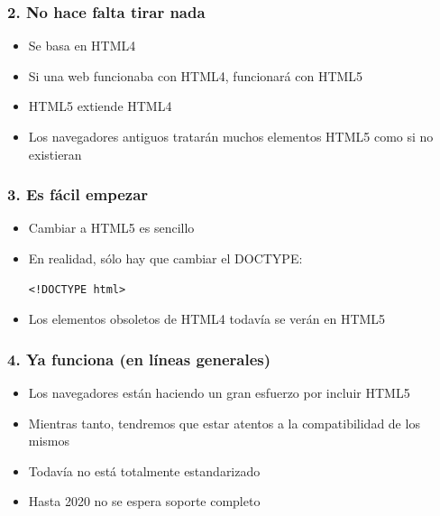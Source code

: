 \begin{frame}
\frametitle{2. No hace falta tirar nada}

\begin{itemize}
  \item Se basa en HTML4
  \item Si una web funcionaba con HTML4, funcionará con HTML5
  \item HTML5 extiende HTML4 
  \item Los navegadores antiguos tratarán muchos elementos HTML5 como si no existieran
\end{itemize}

\end{frame}


\begin{frame}[fragile]
\frametitle{3. Es fácil empezar}

\begin{itemize}
  \item Cambiar a HTML5 es sencillo
  \item En realidad, sólo hay que cambiar el DOCTYPE:
\begin{verbatim}
<!DOCTYPE html>
\end{verbatim}
  \item Los elementos obsoletos de HTML4 todavía se verán en HTML5
\end{itemize}

\end{frame}


\begin{frame}
\frametitle{4. Ya funciona (en líneas generales)}

\begin{itemize}
  \item Los navegadores están haciendo un gran esfuerzo por incluir HTML5
  \item Mientras tanto, tendremos que estar atentos a la compatibilidad de los mismos
  \item Todavía no está totalmente estandarizado
  \item Hasta 2020 no se espera soporte completo
\end{itemize}

\end{frame}


